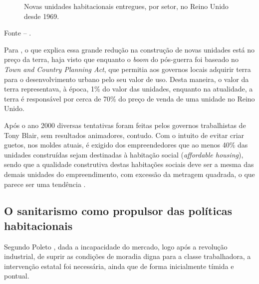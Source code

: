 \documentclass[
	12pt,				%
	oneside,			%
	a4paper,			%
	chapter=TITLE,		%
	section=TITLE,		%
	english,			%
	brazil				%
	]{abntex2}
\newcommand{\bcenter}{\begin{center}}
\newcommand{\ecenter}{\end{center}}
\begin{document}
\begin{refsection}
\begin{figure}[H]
{}

\caption{Novas unidades habitacionais entregues, por setor, no Reino Unido desde 1969.}\label{fig:HUEngland}
\end{figure}
\bcenter

Fonte -- \textcite{HUEngland}.
\ecenter

Para , o que explica essa grande redução
na construção de novas unidades está no preço da terra, haja visto que enquanto
o \emph{boom} do pós-guerra foi baseado no \emph{Town and Country Planning Act}, que
permitia aos governos locais adquirir terra para o desenvolvimento urbano pelo
seu valor de uso. Desta maneira, o valor da terra
representava, à época, 1\% do valor das unidades, enquanto na atualidade, a terra
é responsável por cerca de 70\% do preço de venda de uma unidade no Reino Unido.

Após o ano 2000 diversas tentativas foram feitas pelos governos trabalhistas de
Tony Blair, sem resultados animadores, contudo. Com o intuito de evitar criar
guetos, nos moldes atuais, é exigido dos empreendedores que ao menos 40\% das
unidades construídas sejam destinadas à habitação social (\emph{affordable housing}),
sendo que a qualidade construtiva destas habitações sociais deve ser a mesma das
demais unidades do empreendimento, com excessão da metragem quadrada, o que
parece ser uma tendência \autocite[77]{jung2018}.

\hypertarget{o-sanitarismo-como-propulsor-das-poluxedticas-habitacionais}{%
\subsection{O sanitarismo como propulsor das políticas habitacionais}\label{o-sanitarismo-como-propulsor-das-poluxedticas-habitacionais}}

Segundo Poleto \autocite*[36]{poleto}, dada a incapacidade do mercado, logo após a
revolução industrial, de suprir as condições de moradia digna para a classe
trabalhadora, a intervenção estatal foi necessária, ainda que de forma
inicialmente tímida e pontual.


\end{refsection}
\end{document}
